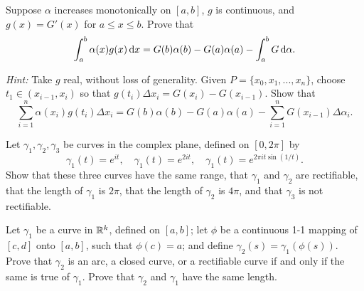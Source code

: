 \begin{myExercise}
    \label{ex:6.17}
    Suppose $\alpha$ increases monotonically on $[a, b]$, 
    $g$ is continuous, and $g(x) = G'(x)$ 
    for $a \leq x \leq b$. 
    Prove that
    \begin{equation*}
        \int_{a}^{b} \alpha(x) g(x) \d x =
        G(b)\alpha(b) - G(a)\alpha(a) - \int_{a}^{b}G \d \alpha .
    \end{equation*}

    \emph{Hint:} Take $g$ real, without loss of generality.
    Given $P = \{x_0,x_1,...,x_n\}$, choose $t_1 \in (x_{i-1},x_i)$ so that $g(t_i)\Delta x_i = G(x_i) - G(x_{i-1})$.
    Show that 
    \begin{equation*}
        \sum_{i=1}^{n} \alpha(x_i) g(t_i) \Delta x_i =
        G(b)\alpha(b) - G(a)\alpha(a) - \sum_{i=1}^{n}G(x_{i-1}) \Delta \alpha_i .
    \end{equation*}
\end{myExercise}


\begin{myExercise}
    \label{ex:6.18}
    Let $\gamma_1, \gamma_2, \gamma_3$ be curves in the complex plane, defined on $[0, 2\pi]$ by
    \begin{equation*}
        \gamma_1(t) = e^{it} , \quad
        \gamma_1(t) = e^{2it} , \quad
        \gamma_1(t) = e^{2\pi it \sin (1/t)} .
    \end{equation*}
    Show that these three curves have the same range, 
    that $\gamma_1$ and $\gamma_2$ are rectifiable, 
    that the length of $\gamma_1$ is $2\pi$, 
    that the length of $\gamma_2$ is $4\pi$, 
    and that $\gamma_3$ is not rectifiable.
\end{myExercise}


\begin{myExercise}
    \label{ex:6.19}
    Let $\gamma_1$ be a curve in ${\protect\mathbb R}^k$, defined on $[a, b]$; 
    let $\phi$ be a continuous 1-1 mapping of $[c, d]$ onto $[a, b]$, such that $\phi(c) = a$; 
    and define $\gamma_2(s) = \gamma_1(\phi(s))$. 
    Prove that $\gamma_2$ is an arc, a closed curve, or a rectifiable curve if and only if the same is true of $\gamma_1$.
    Prove that $\gamma_2$ and $\gamma_1$ have the same length.
\end{myExercise}